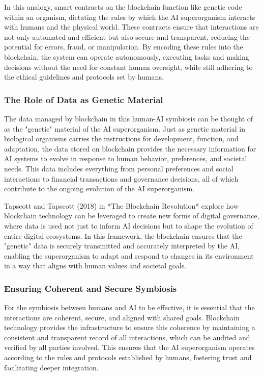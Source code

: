 \documentclass[12pt,twoside]{article}
\begin{document}
In this analogy, smart contracts on the blockchain function like genetic code within an organism, dictating the rules by which the AI superorganism interacts with humans and the physical world. These contracts ensure that interactions are not only automated and efficient but also secure and transparent, reducing the potential for errors, fraud, or manipulation. By encoding these rules into the blockchain, the system can operate autonomously, executing tasks and making decisions without the need for constant human oversight, while still adhering to the ethical guidelines and protocols set by humans.

\subsubsection{The Role of Data as Genetic Material}

The data managed by blockchain in this human-AI symbiosis can be thought of as the "genetic" material of the AI superorganism. Just as genetic material in biological organisms carries the instructions for development, function, and adaptation, the data stored on blockchain provides the necessary information for AI systems to evolve in response to human behavior, preferences, and societal needs. This data includes everything from personal preferences and social interactions to financial transactions and governance decisions, all of which contribute to the ongoing evolution of the AI superorganism.

Tapscott and Tapscott (2018) in *The Blockchain Revolution* explore how blockchain technology can be leveraged to create new forms of digital governance, where data is used not just to inform AI decisions but to shape the evolution of entire digital ecosystems. In this framework, the blockchain ensures that the "genetic" data is securely transmitted and accurately interpreted by the AI, enabling the superorganism to adapt and respond to changes in its environment in a way that aligns with human values and societal goals.

\subsubsection{Ensuring Coherent and Secure Symbiosis}

For the symbiosis between humans and AI to be effective, it is essential that the interactions are coherent, secure, and aligned with shared goals. Blockchain technology provides the infrastructure to ensure this coherence by maintaining a consistent and transparent record of all interactions, which can be audited and verified by all parties involved. This ensures that the AI superorganism operates according to the rules and protocols established by humans, fostering trust and facilitating deeper integration.
\end{document}
